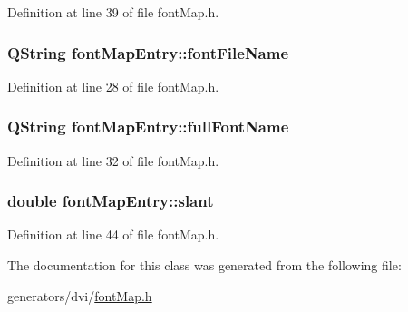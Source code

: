 Definition at line 39 of file font\+Map.\+h.

\hypertarget{classfontMapEntry_af4c8fd84747774e601c2054c55b59612}{
\subsubsection[{font\+File\+Name}]{\setlength{\rightskip}{0pt plus 5cm}Q\+String font\+Map\+Entry\+::font\+File\+Name}}\label{classfontMapEntry_af4c8fd84747774e601c2054c55b59612}


Definition at line 28 of file font\+Map.\+h.

\hypertarget{classfontMapEntry_ad9a5d53d1f22f9189481df1a649c2461}{
\subsubsection[{full\+Font\+Name}]{\setlength{\rightskip}{0pt plus 5cm}Q\+String font\+Map\+Entry\+::full\+Font\+Name}}\label{classfontMapEntry_ad9a5d53d1f22f9189481df1a649c2461}


Definition at line 32 of file font\+Map.\+h.

\hypertarget{classfontMapEntry_a10335359f3ff636c6b38bd3426389d85}{
\subsubsection[{slant}]{\setlength{\rightskip}{0pt plus 5cm}double font\+Map\+Entry\+::slant}}\label{classfontMapEntry_a10335359f3ff636c6b38bd3426389d85}


Definition at line 44 of file font\+Map.\+h.



The documentation for this class was generated from the following file\+:\begin{DoxyCompactItemize}
\item 
generators/dvi/\hyperlink{fontMap_8h}{font\+Map.\+h}\end{DoxyCompactItemize}
